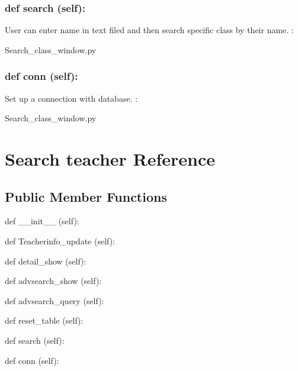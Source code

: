 \hypertarget{class_poly_a14a7ad77ce612b0c54f531d307ee4b39}{
\subsubsection[{def search (self):}]{\setlength{\rightskip}{0pt plus 5cm}def {search} (self):}}\label{class_poly_a14a7ad77ce612b0c54f531d307ee4b39}
User can enter name in text filed and then search specific class by their name.
:\begin{DoxyCompactItemize}
\item 
Search\_class\_window.\-py\end{DoxyCompactItemize}

\hypertarget{class_poly_a14a7ad77ce612b0c54f531d307ee4b39}{
\subsubsection[{def conn (self):}]{\setlength{\rightskip}{0pt plus 5cm}def {conn} (self):}}\label{class_poly_a14a7ad77ce612b0c54f531d307ee4b39}
Set up a connection with database.
:\begin{DoxyCompactItemize}
\item 
Search\_class\_window.\-py\end{DoxyCompactItemize}


\hypertarget{Search_teacher}{\section{Search teacher Reference}
\label{Search_teacher}
}
\subsection*{Public Member Functions}
\begin{DoxyCompactItemize}
\item 
def {\_\_init\_\_} (self):
\item 
def {Teacherinfo\_update} (self):
\item 
def {detail\_show} (self):
\item 
def {advsearch\_show} (self):
\item 
def {advsearch\_query} (self):
\item 
def {reset\_table} (self):
\item 
def {search} (self):
\item 
def {conn} (self):
\end{DoxyCompactItemize}

